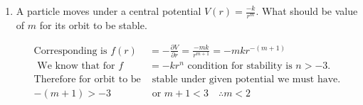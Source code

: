 \begin{enumerate}
\begin{answer}
	\end{answer}
	\item  A particle moves under a central potential $V(r)=\frac{-k}{r^{m}} .$ What should be value of $m$ for its orbit to be stable.
	\begin{answer}
		\begin{align*}
		\text{Corresponding is }f(r)&=-\frac{\partial V}{\partial r}=\frac{-m k}{r^{m+1}}=-m k r^{-(m+1)}\\
		\text{	We know that for }f&=-k r^{n}\text{ condition for stability is $n>-3$.} \\
		\text{Therefore for orbit to be}&\text{ stable under given potential we must have.}\\
		-(m+1)>-3&\text{ or }m+1<3 \quad \therefore m<2
		\end{align*}
	\end{answer}
\end{enumerate}
